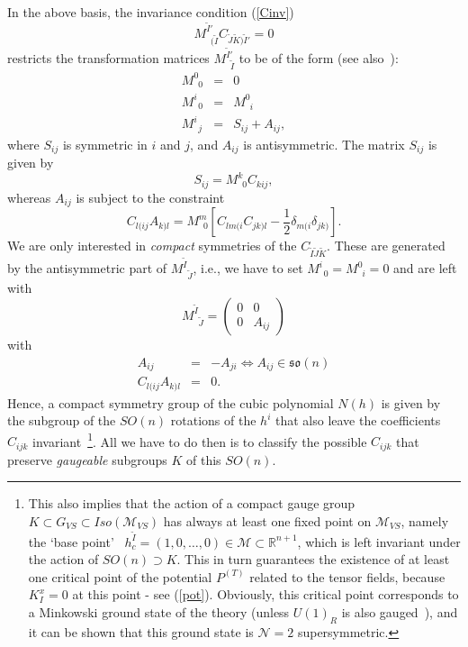 \documentclass[a4paper,11pt]{article}
\newcommand{\nn}{\nonumber}
\newcommand{\ti}{\ensuremath{\tilde{I}}}
\newcommand{\tj}{\ensuremath{\tilde{J}}}
\newcommand{\tk}{\ensuremath{\tilde{K}}}
\newcommand{\M}{\ensuremath{\mathcal{M}}}
\begin{document}
In the above basis, the invariance condition (\ref{Cinv})
\begin{equation}
M^{\ti'}_{\,\,\, (\ti }C_{\tj\tk)\ti'}=0
\end{equation}
restricts the transformation matrices $M^{\ti'}_{\,\,\, \ti }$ to
be of the form (see also~\cite{dWvP2}):
\begin{eqnarray}
M^{0}_{\,\,\, 0 }&=&0 \nn \\
M^{i}_{\,\,\, 0 }&=&M^{0}_{\,\,\, i }\\
M^{i}_{\,\,\, j }&=&S_{ij}+A_{ij}, \nn 
\end{eqnarray}
where $S_{ij}$ is symmetric in $i$ and $j$, and $A_{ij}$ is
antisymmetric. The matrix $S_{ij}$ is given by
\begin{equation}
S_{ij}=M^{k}_{\,\,\, 0 }C_{kij},
\end{equation}
whereas $A_{ij}$ is subject to the constraint
\begin{equation}\label{AM}
C_{l(ij}A_{k)l}=M^{m}_{\,\,\, 0}\left[
C_{lm(i}C_{jk)l}-\frac{1}{2}\delta_{m(i}\delta_{jk)}\right].
\end{equation}
We are only interested in \emph{compact} symmetries of the
$C_{\ti\tj\tk}$. These are generated by the antisymmetric part of
$M^{\ti}_{\,\,\, \tj }$, i.e., we have to set $M^{i}_{\,\,\, 0
}=M^{0}_{\,\,\, i }=0$ and are left with
\begin{equation}
M^{\ti}_{\,\,\, \tj }=\left(
\begin{array}{cc}
0&0\\
0&A_{ij}
\end{array}
\right)
\end{equation}
with
\begin{eqnarray}
A_{ij}&=&- A_{ji} \Longleftrightarrow A_{ij}\in \mathfrak{so}(n)\\
C_{l(ij}A_{k)l}&=&0.
\end{eqnarray}
Hence, a compact symmetry group of the cubic polynomial $N(h)$ is
given by the subgroup of the $SO(n)$ rotations of the $h^{i}$ that
also leave the coefficients $C_{ijk}$ invariant~\footnote{This
also implies that the action of a compact gauge group $K\subset
G_{VS}\subset Iso(\M_{VS})$  has always at least one fixed point
on $\M_{VS}$, namely the `base point'~\cite{GST1}
$h_{c}^{\ti}=(1, 0, \ldots, 0)\in \M\subset
\mathbb{R}^{n+1}$, which is left invariant under the action of
$SO(n)\supset K$. This in turn guarantees the existence of at
least one critical point of the potential
$P^{(T)}$ related to the tensor fields, because $K_{I}^{x}=0$ at this point 
- see (\ref{pot}). Obviously, this
critical point corresponds to a Minkowski ground state of the
theory (unless $U(1)_R$ is also gauged~\cite{GZ2}), and it can be shown
that this ground state is
$\mathcal{N}=2$ supersymmetric.}. All we have to do then is to
classify the possible $C_{ijk}$ that preserve \emph{gaugeable}
subgroups $K$ of this $SO(n)$.
\end{document}
